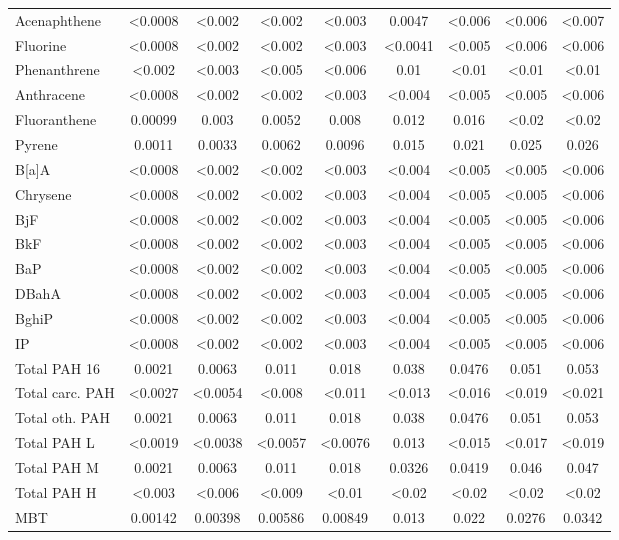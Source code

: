 \documentclass[algorithms,article,submit,pdftex,moreauthors]{Definitions/mdpi}
\begin{document}
\begin{scriptsize}
\begin{center}
\begin{longtable}{@{\extracolsep{\fill}}|p{1.8cm}|cccccccc|@{}}
Acenaphthene & <0.0008 & <0.002 & <0.002 & <0.003 & 0.0047 & <0.006 & <0.006 & <0.007 \\
Fluorine & <0.0008 & <0.002 & <0.002 & <0.003 & <0.0041 & <0.005 & <0.006 & <0.006 \\
Phenanthrene & <0.002 & <0.003 & <0.005 & <0.006 & 0.01 & <0.01 & <0.01 & <0.01  \\
Anthracene & <0.0008 & <0.002 & <0.002 & <0.003 & <0.004 & <0.005 & <0.005 & <0.006  \\
Fluoranthene & 0.00099 & 0.003 & 0.0052 & 0.008 & 0.012 & 0.016 & <0.02 & <0.02 \\
Pyrene & 0.0011 & 0.0033 & 0.0062 & 0.0096 & 0.015 & 0.021 & 0.025 & 0.026 \\
B[a]A & <0.0008 & <0.002 & <0.002 & <0.003 & <0.004 & <0.005 & <0.005 & <0.006  \\
Chrysene & <0.0008 & <0.002 & <0.002 & <0.003 & <0.004 & <0.005 & <0.005 & <0.006  \\
BjF  & <0.0008 & <0.002 & <0.002 & <0.003 & <0.004 & <0.005 & <0.005 & <0.006  \\
BkF & <0.0008 & <0.002 & <0.002 & <0.003 & <0.004 & <0.005 & <0.005 & <0.006  \\
BaP & <0.0008 & <0.002 & <0.002 & <0.003 & <0.004 & <0.005 & <0.005 & <0.006  \\
DBahA & <0.0008 & <0.002 & <0.002 & <0.003 & <0.004 & <0.005 & <0.005 & <0.006  \\
BghiP & <0.0008 & <0.002 & <0.002 & <0.003 & <0.004 & <0.005 & <0.005 & <0.006  \\
IP & <0.0008 & <0.002 & <0.002 & <0.003 & <0.004 & <0.005 & <0.005 & <0.006  \\
Total PAH 16 & 0.0021 & 0.0063 & 0.011 & 0.018 & 0.038 & 0.0476 & 0.051 & 0.053 \\
Total carc. PAH & <0.0027 & <0.0054 & <0.008 & <0.011 & <0.013 & <0.016 & <0.019 & <0.021 \\
Total oth. PAH & 0.0021 & 0.0063 & 0.011 & 0.018 & 0.038 & 0.0476 & 0.051 & 0.053 \\
Total PAH L & <0.0019 & <0.0038 & <0.0057 & <0.0076 & 0.013 & <0.015 & <0.017 &  <0.019 \\
Total PAH M & 0.0021 & 0.0063 & 0.011 & 0.018 & 0.0326 & 0.0419 & 0.046 &  0.047 \\
Total PAH H & <0.003 & <0.006 & <0.009 & <0.01 & <0.02 & <0.02 & <0.02 & <0.02 \\
MBT & 0.00142 & 0.00398 & 0.00586 & 0.00849 & 0.013 & 0.022 & 0.0276 & 0.0342 \\

\end{longtable}
\end{center}
\end{scriptsize}
\end{document}
